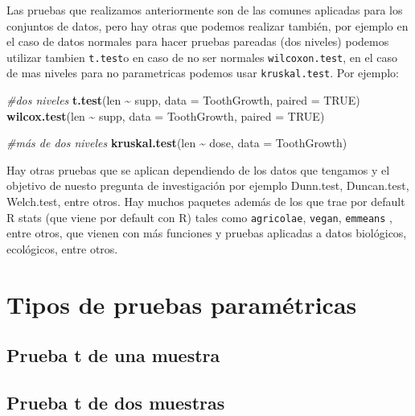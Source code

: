 \documentclass[
]{book}
\newenvironment{Shaded}{\begin{snugshade}}{\end{snugshade}}
\newcommand{\AttributeTok}[1]{\textcolor[rgb]{0.13,0.29,0.53}{#1}}
\newcommand{\CommentTok}[1]{\textcolor[rgb]{0.56,0.35,0.01}{\textit{#1}}}
\newcommand{\ConstantTok}[1]{\textcolor[rgb]{0.56,0.35,0.01}{#1}}
\newcommand{\FunctionTok}[1]{\textcolor[rgb]{0.13,0.29,0.53}{\textbf{#1}}}
\newcommand{\NormalTok}[1]{#1}
\newcommand{\SpecialCharTok}[1]{\textcolor[rgb]{0.81,0.36,0.00}{\textbf{#1}}}
\begin{document}
Las pruebas que realizamos anteriormente son de las comunes aplicadas para los conjuntos de datos, pero hay otras que podemos realizar también, por ejemplo en el caso de datos normales para hacer pruebas pareadas (dos niveles) podemos utilizar tambien \texttt{t.test}o en caso de no ser normales \texttt{wilcoxon.test}, en el caso de mas niveles para no parametricas podemos usar \texttt{kruskal.test}.
Por ejemplo:\\

\begin{Shaded}
\begin{Highlighting}[]
\CommentTok{\#dos niveles}
\FunctionTok{t.test}\NormalTok{(len }\SpecialCharTok{\textasciitilde{}}\NormalTok{ supp, }\AttributeTok{data =}\NormalTok{ ToothGrowth, }\AttributeTok{paired =} \ConstantTok{TRUE}\NormalTok{)}
\FunctionTok{wilcox.test}\NormalTok{(len }\SpecialCharTok{\textasciitilde{}}\NormalTok{ supp, }\AttributeTok{data =}\NormalTok{ ToothGrowth, }\AttributeTok{paired =} \ConstantTok{TRUE}\NormalTok{)}

\CommentTok{\#más de dos niveles}
\FunctionTok{kruskal.test}\NormalTok{(len }\SpecialCharTok{\textasciitilde{}}\NormalTok{ dose, }\AttributeTok{data =}\NormalTok{ ToothGrowth)}
\end{Highlighting}
\end{Shaded}

\hfill\break
Hay otras pruebas que se aplican dependiendo de los datos que tengamos y el objetivo de nuesto pregunta de investigación por ejemplo Dunn.test, Duncan.test, Welch.test, entre otros.
Hay muchos paquetes además de los que trae por default R stats (que viene por default con R) tales como \texttt{agricolae}, \texttt{vegan}, \texttt{emmeans} , entre otros, que vienen con más funciones y pruebas aplicadas a datos biológicos, ecológicos, entre otros.

\chapter{Tipos de pruebas paramétricas}\label{tipos-de-pruebas-paramuxe9tricas}

\section{Prueba t de una muestra}\label{prueba-t-de-una-muestra}

\section{Prueba t de dos muestras}\label{prueba-t-de-dos-muestras}
\end{document}
